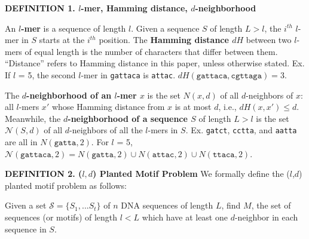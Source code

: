 \documentclass[oneside,12pt]{DISCSthesis}
\begin{document}
		\noindent\textbf{\boldmath DEFINITION 1. $l$-mer, Hamming distance, $d$-neighborhood}

		\noindent An \textbf{\boldmath $l$-mer} is a sequence of length $l$. Given a sequence $S$ of length $L > l$, the $i^{th}$ $l$-mer in $S$ starts at the $i^{th}$ position. The \textbf{\boldmath Hamming distance $dH$} between two $l$-mers of equal length is the number of characters that differ between them. ``Distance'' refers to Hamming distance in this paper, unless otherwise stated.
		\newline\hspace*{35pt} Ex. If $l$ = 5, the second $l$-mer in \texttt{gattaca} is \texttt{attac}.
		\newline\hspace*{55pt} $dH(\texttt{gattaca}, \texttt{cgttaga}) = 3$.

		\noindent The \textbf{\boldmath $d$-neighborhood of an $l$-mer $x$} is the set {\boldmath $N(x, d)$} of all $d$-neighbors of $x$: all $l$-mers $x'$ whose Hamming distance from $x$ is at most $d$, i.e., {\boldmath $dH (x, x') \leq d$}. 
		Meanwhile, the \textbf{\boldmath $d$-neighborhood of a sequence $S$} of length $L > l$ is the set {\boldmath $\mathcal{N}(S, d)$} of all $d$-neighbors of all the $l$-mers in $S$.
		\newline\hspace*{35pt} Ex. \texttt{gatct}, \texttt{cctta}, and \texttt{aatta} are all in $N(\texttt{gatta}, 2)$.
		\newline\hspace*{55pt} For $l$ = 5,
			$\mathcal{N}(\texttt{gattaca}, 2) 
					= N(\texttt{gatta}, 2) \cup 
						N(\texttt{attac}, 2) \cup
						N(\texttt{ttaca}, 2)$.\newline
		
		\noindent\textbf{\boldmath DEFINITION 2. ($l,d$) Planted Motif Problem}
		\newline We formally define the ($l$,$d$) planted motif problem as follows:\bigskip

		\noindent\hspace*{50pt} Given a set $\mathcal{S} = \{S_{1},...S_{t}\}$ of $n$ DNA sequences of length $L$,
		\newline \hspace*{50pt} find $M$, the set of sequences (or motifs) of length $l < L$
		\newline \hspace*{50pt} which have at least one $d$-neighbor in each sequence in $S$. %
		
\end{document}
